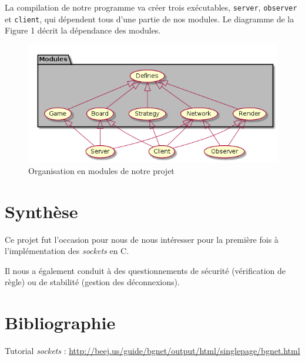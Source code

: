 \documentclass[12pt]{article}
\def\sec#1{\section{#1}}
\begin{document}
La compilation de notre programme va créer trois exécutables, \texttt{server}, \texttt{observer} et \texttt{client}, qui dépendent tous d'une partie de nos modules. Le diagramme de la Figure 1 décrit la dépendance des modules. \\


\begin{figure}
\begin{center}
\includegraphics[scale=0.6]{diagramme.png}
\caption{Organisation en modules de notre projet}
\end{center}
\end{figure}


\sec{Synthèse}

Ce projet fut l'occasion pour nous de nous intéresser pour la première fois à l'implémentation des \textit{sockets} en C.

Il nous a également conduit à des questionnements de sécurité (vérification de règle) ou de stabilité (gestion des déconnexions).

\sec{Bibliographie}
Tutorial \textit{sockets} : \url{http://beej.us/guide/bgnet/output/html/singlepage/bgnet.html}
\end{document}

